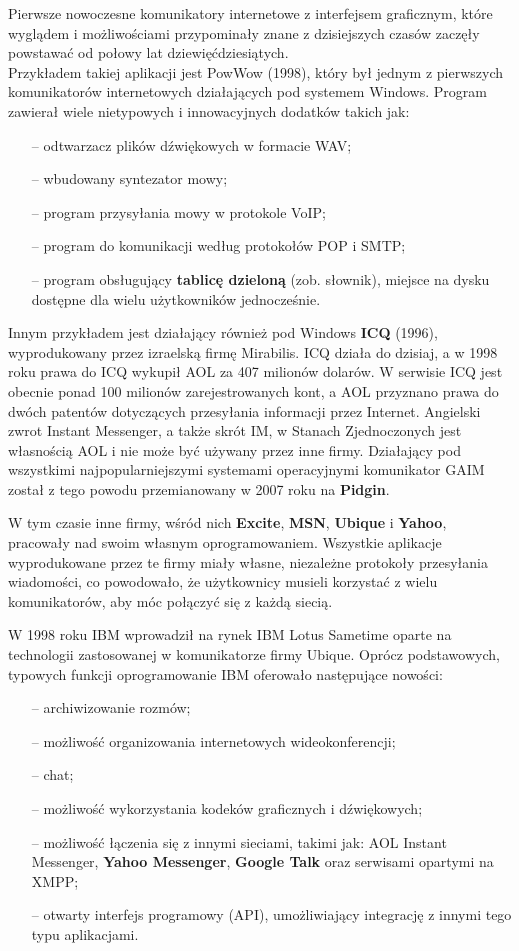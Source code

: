 \documentclass[a4paper,12pt]{article}
\begin{document}
\par Pierwsze nowoczesne komunikatory internetowe z interfejsem graficznym, które wyglądem i możliwościami przypominały znane z dzisiejszych czasów zaczęły powstawać od połowy lat dziewięćdziesiątych.\\
Przykładem takiej aplikacji jest PowWow (1998), który był jednym z pierwszych komunikatorów internetowych działających pod systemem Windows. Program zawierał wiele nietypowych i innowacyjnych dodatków takich jak:
\begin{itemize}
    \item[--] odtwarzacz plików dźwiękowych w formacie WAV;
    \item[--] wbudowany syntezator mowy;
    \item[--] program przysyłania mowy w protokole VoIP;
    \item[--] program do komunikacji według protokołów POP i SMTP;
    \item[--] program obsługujący \textbf{tablicę dzieloną} (zob. słownik), miejsce na dysku dostępne dla wielu użytkowników jednocześnie.
\end{itemize}
Innym przykładem jest działający również pod Windows \textbf{ICQ} (1996), wyprodukowany przez izraelską firmę Mirabilis. ICQ działa do dzisiaj, a w 1998 roku prawa do ICQ wykupił AOL za 407 milionów dolarów. W serwisie ICQ jest obecnie ponad 100 milionów zarejestrowanych kont, a AOL przyznano prawa do dwóch patentów dotyczących przesyłania informacji przez Internet. Angielski zwrot Instant Messenger, a także skrót IM, w Stanach Zjednoczonych jest własnością AOL i nie może być używany przez inne firmy. Działający pod wszystkimi najpopularniejszymi systemami operacyjnymi komunikator GAIM został z tego powodu przemianowany w 2007 roku na \textbf{Pidgin}.

W tym czasie inne firmy, wśród nich \textbf{Excite}, \textbf{MSN}, \textbf{Ubique} i \textbf{Yahoo}, pracowały nad swoim własnym oprogramowaniem.
Wszystkie aplikacje wyprodukowane przez te firmy miały własne, niezależne protokoły przesyłania wiadomości, co powodowało, że użytkownicy musieli korzystać z wielu komunikatorów, aby móc połączyć się z każdą siecią.

\par W 1998 roku IBM wprowadził na rynek IBM Lotus Sametime oparte na technologii zastosowanej w komunikatorze firmy Ubique. Oprócz podstawowych, typowych funkcji oprogramowanie IBM oferowało następujące nowości:
\begin{itemize}
    \item[--] archiwizowanie rozmów;
    \item[--] możliwość organizowania internetowych wideokonferencji;
    \item[--] chat;
    \item[--] możliwość wykorzystania kodeków graficznych i dźwiękowych;
    \item[--] możliwość łączenia się z innymi sieciami, takimi jak: AOL Instant Messenger, \textbf{Yahoo Messenger}, \textbf{Google Talk} oraz serwisami opartymi na XMPP;
    \item[--] otwarty interfejs programowy (API), umożliwiający integrację z innymi tego typu aplikacjami.
\end{itemize}
\end{document}
